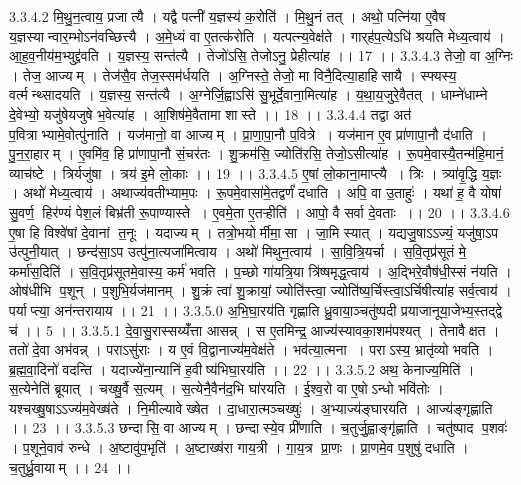 3.3.4.2
मि॒थु॒न॒त्वाय॒ प्रजात्यै । यद्वै पत्नी॑ य॒ज्ञस्य॑ क॒रोति॑ । मि॒थु॒नं तत् । अथो॒ पत्नि॑या ए॒वैष य॒ज्ञस्यान्वार॒म्भोऽन॑वच्छित्त्यै । अ॒मे॒ध्यं वा ए॒तत्क॑रोति । यत्पत्न्य॒वेक्ष॑ते । गार्‌ह॑प॒त्येऽधि॑ श्रयति मेध्य॒त्वाय॑ । आ॒ह॒व॒नीय॑म॒भ्युद्द्र॑वति । य॒ज्ञस्य॒ सन्त॑त्यै । तेजो॑ऽसि॒ तेजोऽनु॒ प्रेहीत्या॑ह ।। 17 ।।
3.3.4.3
तेजो॒ वा अ॒ग्निः । तेज॒ आज्यम् । तेज॑सै॒व तेज॒स्सम॑र्धयति । अ॒ग्निस्ते॒ तेजो॒ मा विनै॒दित्या॒हाहि॑सायै । स्फ्यस्य॒ वर्त्मन्थ्सादयति । य॒ज्ञस्य॒ सन्त॑त्यै । अ॒ग्नेर्जि॒ह्वाऽसि॑ सु॒भूर्दे॒वाना॒मित्या॑ह । य॒था॒य॒जुरे॒वैतत् । धाम्ने॑धाम्ने दे॒वेभ्यो॒ यजु॑षेयजुषे भ॒वेत्या॑ह । आ॒शिष॑मे॒वैतामा शास्ते ।। 18 ।।
3.3.4.4
तद्वा अत॑ प॒वित्राभ्यामे॒वोत्पु॑नाति । यज॑मानो॒ वा आज्यम् । प्रा॒णा॒पा॒नौ प॒वित्रे । यज॑मान ए॒व प्रा॑णापा॒नौ द॑धाति । पु॒न॒रा॒हारम् । ए॒वमि॑व॒ हि प्रा॑णापा॒नौ सं॒चर॑तः । शु॒क्रम॑सि॒ ज्योति॑रसि॒ तेजो॒ऽसीत्या॑ह । रू॒पमे॒वास्यै॒तन्म॑हि॒मानं॒ व्याच॑ष्टे । त्रिर्यजु॑षा । त्रय॑ इ॒मे लो॒काः ।। 19 ।।
3.3.4.5
ए॒षां लो॒काना॒माप्त्यै । त्रिः । त्र्या॑वृ॒द्धि य॒ज्ञः । अथो॑ मेध्य॒त्वाय॑ । अथाज्य॑वतीभ्याम॒पः । रू॒पमे॒वासा॑मे॒तद्वर्णं॑ दधाति । अपि॒ वा उ॒ताहुः॑ । यथा॑ ह॒ वै योषा॑ सु॒वर्ण॒॒ हिर॑ण्यं पेश॒लं बिभ्र॑ती रू॒पाण्यास्ते । ए॒वमे॒ता ए॒तऱ्हीति॑ । आपो॒ वै सर्वा दे॒वताः ।। 20 ।।
3.3.4.6
ए॒षा हि विश्वे॑षां दे॒वानां त॒नूः । यदाज्यम् । तत्रो॒भयोर्मीमा॒॒सा । जा॒मि स्यात् । यद्यजु॒षाऽऽज्यं॒ यजु॑षा॒ऽप उ॑त्पुनी॒यात् । छन्द॑सा॒ऽप उत्पु॑ना॒त्यजा॑मित्वाय । अथो॑ मिथुन॒त्वाय॑ । सा॒वि॒त्रि॒यर्चा । स॒वि॒तृप्र॑सूतं मे॒ कर्मा॑स॒दिति॑ । स॒वि॒तृप्र॑सूतमे॒वास्य॒ कर्म॑ भवति । प॒च्छो गा॑यत्रि॒या त्रि॑ष्षमृद्ध॒त्वाय॑ । अ॒द्भिरे॒वौष॑धी॒स्सं न॑यति । ओष॑धीभि प॒शून् । प॒शुभि॒र्यज॑मानम् । शु॒क्रं त्वा॑ शु॒क्रायां॒ ज्योति॑स्त्वा॒ ज्योति॑ष्य॒र्चिस्त्वा॒ऽर्चिषीत्या॑ह सर्व॒त्वाय॑ । पर्याप्त्या॒ अन॑न्तरायाय ।। 21 ।।
3.3.5.0
अ॒भि॒घा॒रय॑ति गृह्णाति ध्रु॒वाया॒ञ्चतु॑ष्पदी प्रयाजानूया॒जेभ्य॒स्तद्द्वे च॑ ।। 5 ।।
3.3.5.1
दे॒वा॒सु॒रास्सय्यँ॑त्ता आसन्न् । स ए॒तमिन्द्र॒ आज्य॑स्यावका॒शम॑पश्यत् । तेनावैक्षत । ततो॑ दे॒वा अभ॑वन्न् । पराऽसु॑राः । य ए॒वं वि॒द्वानाज्य॑म॒वेक्ष॑ते । भव॑त्या॒त्मना । पराऽस्य॒ भ्रातृ॑व्यो भवति । ब्र॒ह्म॒वा॒दिनो॑ वदन्ति । यदाज्ये॑ना॒न्यानि॑ ह॒वीष्य॑भिघा॒रय॑ति ।। 22 ।।
3.3.5.2
अथ॒ केनाज्य॒मिति॑ । स॒त्येनेति॑ ब्रूयात् । चख्षु॒र्वै स॒त्यम् । स॒त्येनै॒वैन॑द॒भि घा॑रयति । ई॒श्व॒रो वा ए॒षोऽन्धो भवि॑तोः । यश्चख्षु॒षाऽऽज्य॑म॒वेख्ष॑ते । नि॒मील्यावेख्षेत । दा॒धारा॒त्मञ्चख्षुः॑ । अ॒भ्याज्य॑ङ्घारयति । आज्य॑ङ्गृह्णाति ।। 23 ।।
3.3.5.3
छन्दा॑सि॒ वा आज्यम् । छन्दा॑स्ये॒व प्री॑णाति । च॒तुर्जु॒ह्वाङ्गृ॑ह्णाति । चतु॑ष्पाद प॒शवः॑ । प॒शूने॒वाव॑ रुन्धे । अ॒ष्टावु॑प॒भृति॑ । अ॒ष्टाख्ष॑रा गाय॒त्री । गा॒य॒त्र प्रा॒णः । प्रा॒णमे॒व प॒शुषु॑ दधाति । च॒तुर्ध्रु॒वायाम् ।। 24 ।।
